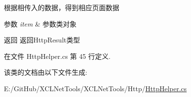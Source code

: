 根据相传入的数据，得到相应页面数据 


\begin{DoxyParams}{参数}
{\em item} & 参数类对象\\
\hline
\end{DoxyParams}
\begin{DoxyReturn}{返回}
返回\+Http\+Result类型
\end{DoxyReturn}


在文件 Http\+Helper.\+cs 第 45 行定义.



该类的文档由以下文件生成\+:\begin{DoxyCompactItemize}
\item 
E\+:/\+Git\+Hub/\+X\+C\+L\+Net\+Tools/\+X\+C\+L\+Net\+Tools/\+Http/\hyperlink{_http_helper_8cs}{Http\+Helper.\+cs}\end{DoxyCompactItemize}
